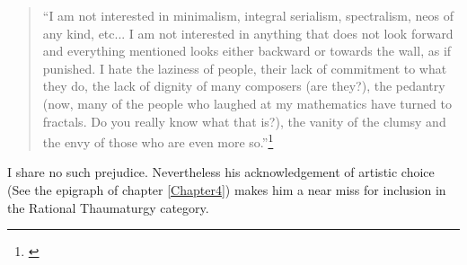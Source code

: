 \begin{quote}
\singlespacing
``I am not interested in minimalism, integral serialism, spectralism, neos of any kind, etc... I am not interested in anything that does not look forward and everything mentioned looks either backward or towards the wall, as if punished. I hate the laziness of people, their lack of commitment to what they do, the lack of dignity of many composers (are they?), the pedantry (now, many of the people who laughed at my mathematics have turned to fractals. Do you really know what that is?), the vanity of the clumsy and the envy of those who are even more so.''\footnote{\citet[173]{guerrero-quote}}
\end{quote}

I share no such prejudice. Nevertheless his acknowledgement of artistic choice (See the epigraph of chapter \vref{Chapter4}) makes him a near miss for inclusion in the Rational Thaumaturgy category.

